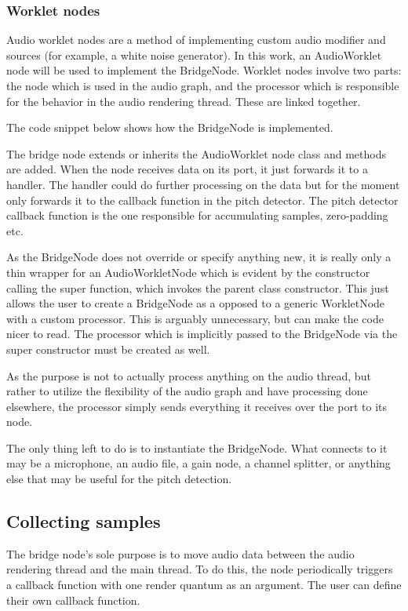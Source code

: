 \subsubsection{Worklet nodes}
Audio worklet nodes are a method of implementing custom audio modifier and sources (for example, a white noise generator). In this work, an AudioWorklet node will be used to implement the BridgeNode. Worklet nodes involve two parts: the node which is used in the audio graph, and the processor which is responsible for the behavior in the audio rendering thread. These are linked together.

The code snippet below shows how the BridgeNode is implemented.

The bridge node extends or inherits the AudioWorklet node class and methods are added. When the node receives data on its port, it just forwards it to a handler. The handler could do further processing on the data but for the moment only forwards it to the callback function in the pitch detector. The pitch detector callback function is the one responsible for accumulating samples, zero-padding etc.

As the BridgeNode does not override or specify anything new, it is really only a thin wrapper for an AudioWorkletNode which is evident by the constructor calling the super function, which invokes the parent class constructor. This just allows the user to create a BridgeNode as a opposed to a generic WorkletNode with a custom processor. This is arguably unnecessary, but can make the code nicer to read. The processor which is implicitly passed to the BridgeNode via the super constructor must be created as well.



As the purpose is not to actually process anything on the audio thread, but rather to utilize the flexibility of the audio graph and have processing done elsewhere, the processor simply sends everything it receives over the port to its node. 

The only thing left to do is to instantiate the BridgeNode. What connects to it may be a microphone, an audio file, a gain node, a channel splitter, or anything else that may be useful for the pitch detection.


\subsection{Collecting samples}
The bridge node's sole purpose is to move audio data between the audio rendering thread and the main thread. To do this, the node periodically triggers a callback function with one render quantum as an argument. The user can define their own callback function.

